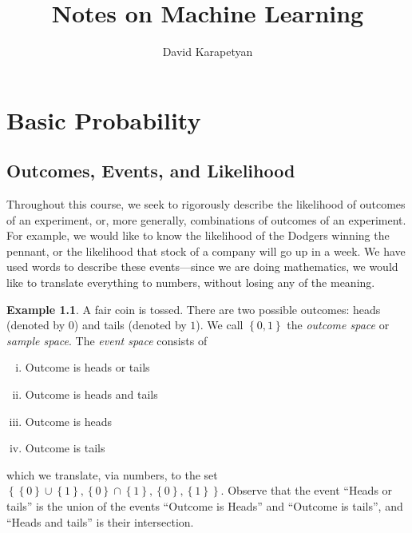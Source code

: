 \documentclass[12pt]{amsbook}
\theoremstyle{plain}
\theoremstyle{definition}
\newtheorem*{example}{Example}
\theoremstyle{remark}
\numberwithin{equation}{section}  %
\numberwithin{equation}{section}  %
\begin{document}
\title{Notes on Machine Learning}
\author{David Karapetyan}
\date{}
\maketitle
\newpage
\setcounter{tocdepth}{2}
\tableofcontents
\part{Basic Probability}
\chapter{Outcomes, Events, and Likelihood}
Throughout this course, we seek to rigorously describe the likelihood of
outcomes of an experiment, or, more generally, combinations of outcomes of an 
experiment.
For example, we would like to know the likelihood of the Dodgers
winning the pennant, or the likelihood that stock of a company will go up
in a week. We have used words to describe these events---since we are doing
mathematics, we would like to translate everything to numbers, without losing
any of the meaning.
\begin{example}
	A fair coin is tossed. There are two possible outcomes: heads (denoted by 
	$0$) 
	and tails (denoted by $1$). We call $ \left\{ 0,1 \right\} $ the 
	\emph{outcome
	space} or \emph{sample space}. The \emph{event space} consists of
	\begin{enumerate}[(i)]
		\item Outcome is heads or tails
		\item Outcome is heads and tails
		\item Outcome is heads
		\item Outcome is tails
	\end{enumerate}
	which we translate, via numbers, to the set $ \left\{ \left\{ 0 \right\} 
	\cup
	\left\{ 1 \right\}, \left\{ 0 \right\} \cap \left\{ 1 \right\} , \left\{ 0
	\right\} , \left\{ 1 \right\} \right \}$.
	Observe that the event ``Heads or tails'' is the union of the events
	``Outcome is Heads'' and ``Outcome is tails'', and ``Heads and tails'' is
	their intersection.
\end{example}	
\end{document}
